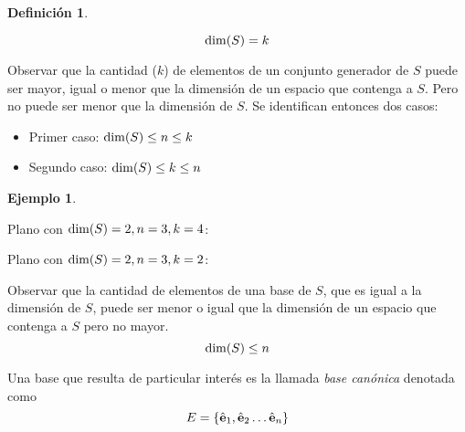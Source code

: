 \documentclass[a5paper,12pt,twoside]{book}
\newtheorem{defn}{{Definición}}[chapter]
\newtheorem{example}{{Ejemplo}}[chapter]
\begin{document}
\begin{mdframed}[style=MyFrame1]
    \begin{defn}
    \end{defn}
    \begin{equation*}
        \operatorname{dim}(S) = k
    \end{equation*}
\end{mdframed}

Observar que la cantidad ($k$) de elementos de un conjunto generador de $S$ puede ser mayor, igual o menor que la dimensión de un espacio que contenga a $S$. Pero no puede ser menor que la dimensión de $S$. Se identifican entonces dos casos:
\begin{itemize}
    \item Primer caso: $\operatorname{dim}(S) \leq n \leq k$
    \item Segundo caso: $\operatorname{dim}(S) \leq k \leq n$
\end{itemize}

\begin{mdframed}[style=MyFrame2]
    \begin{example}
    \end{example}
    Plano con $\operatorname{dim}(S)=2, n=3, k=4$:

    \begin{center}
    \end{center}

    Plano con $\operatorname{dim}(S)=2, n=3, k=2$:

    \begin{center}
    \end{center}
\end{mdframed}

Observar que la cantidad de elementos de una base de $S$, que es igual a la dimensión de $S$, puede ser menor o igual que la dimensión de un espacio que contenga a $S$ pero no mayor.
\begin{equation*}
    \operatorname{dim}(S)\leq n
\end{equation*}

Una base que resulta de particular interés es la llamada \emph{base canónica} denotada como
\begin{equation*}
    E = { \left\{ {\hat{\textbf{e}}_1,\hat{\textbf{e}}_2 \dots \hat{\textbf{e}}_n} \right\} }
\end{equation*}
\end{document}
